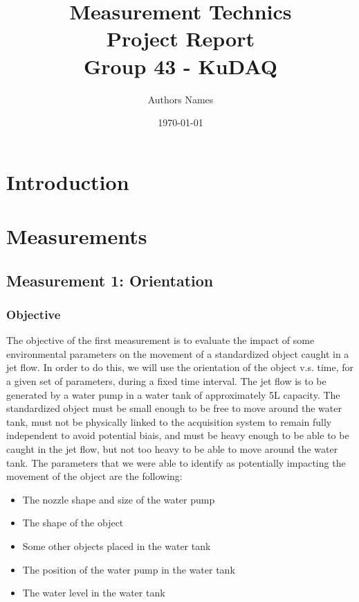 \documentclass[10pt, a4paper, twocolumn]{article}
\title{\textbf{\textcolor{CatppuccinMauve}{Measurement Technics\\Project Report}}\\{\textcolor{CatppuccinBlue}{Group 43 - KuDAQ}}}
\author{\textcolor{CatppuccinSubtext1}{Authors Names}}
\date{\textcolor{CatppuccinSubtext1}{\today}}
\begin{document}
\pagecolor{CatppuccinBase}
\color{CattppuccinText}

\maketitle

\newpage
\tableofcontents
\newpage

\section{Introduction}

\newpage
\section{Measurements}

\subsection{Measurement 1: Orientation}
\label{sec:measurement1}

\subsubsection{Objective}

The objective of the first measurement is to evaluate the impact of some environmental parameters on the movement of a standardized object caught in a jet flow. In order to do this, we will use the orientation of the object v.s. time, for a given set of parameters, during a fixed time interval. The jet flow is to be generated by a water pump in a water tank of approximately 5L capacity. The standardized object must be small enough to be free to move around the water tank, must not be physically linked to the acquisition system to remain fully independent to avoid potential biais, and must be heavy enough to be able to be caught in the jet flow, but not too heavy to be able to move around the water tank. The parameters that we were able to identify as potentially impacting the movement of the object are the following:

\begin{itemize}
    \item The nozzle shape and size of the water pump
    \item The shape of the object
    \item Some other objects placed in the water tank
    \item The position of the water pump in the water tank
    \item The water level in the water tank
\end{itemize}
\end{document}
